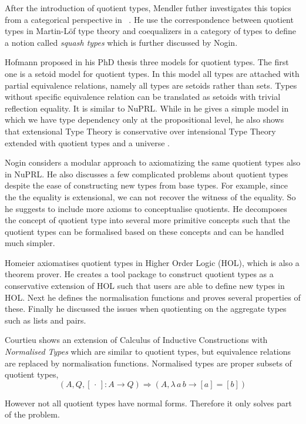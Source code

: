 \documentclass[envcountsame]{llncs}
\newcommand{\dotph}{\,\cdot\,}
\providecommand{\class}[1]{[#1]}
\newcommand{\itt}{intensional Type Theory}
\newcommand{\mltt}{Martin-L\"{o}f type theory}
\begin{document}
 After the introduction of quotient types, Mendler futher investigates
 this topics from a categorical perspective in ~\cite{men:90}. He use
 the correspondence between quotient types in \mltt{} and coequalizers
 in a category of types to define a notion called \emph{squash types}
 which is further discussed by Nogin.


Hofmann proposed  in his PhD thesis \cite{hof:phd} three models for
quotient types. The first one is a setoid model for
quotient types. In this model all types are attached with partial
equivalence relations, namely all types are setoids rather than
sets. Types without specific equivalence relation can be translated as setoids with trivial reflection equality. It is similar to NuPRL. While in \cite{hof:95:sm} he gives a simple model in which we have type dependency only at the propositional level, he also shows that extensional Type Theory is conservative over \itt {}  extended with quotient types and a universe \cite{hof:95:con}.

Nogin \cite{nog:02} considers a modular approach to axiomatizing the
same quotient types also in NuPRL. He also discusses a few complicated
problems about quotient types despite the ease of constructing new types
from base types. For example, since the the equality is
extensional, we can not recover the
witness of the equality. So he suggests to include more axioms to
conceptualise quotients. He decomposes the concept of quotient type
into several more primitive concepts such that the quotient types can
be formalised based on these concepts and can be handled much
simpler. 

Homeier \cite{hom} axiomatises quotient types in Higher Order Logic
(HOL), which is also a theorem prover. He creates a tool package to
construct quotient types as a conservative extension of HOL such that
users are able to define new types in HOL. Next he defines the
normalisation functions and proves several properties of
these. Finally he discussed the issues when quotienting on the
aggregate types such as lists and pairs.


Courtieu \cite{cou:01} shows an extension of Calculus of Inductive Constructions
with \emph{Normalised Types} which are similar to quotient types, but equivalence relations are replaced by normalisation functions. Normalised types are proper subsets of quotient types,
\[ (A, Q, \class\dotph \colon A \to Q) \Rightarrow(A, \lambda \,a \,b\to \class a = \class b)\]

However not all quotient types have normal forms. Therefore it only solves part of the problem.
\end{document}
